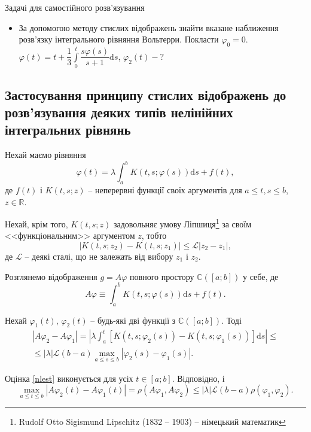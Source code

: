 \documentclass[14pt,twoside]{extreport}
\theoremstyle{mystyle}
\newcommand{\problems}{\bigskip\noindent\fbox{\HandPencilLeft}\hspace{6pt}\textsf{Задачі
		для самостійного розв'язування}}
\numberwithin{equation}{chapter}
\newcommand{\cab}{\mathbb{C}([a; b])}
\begin{document}
\begin{small}
\problems
\begin{itemize}
	\item За допомогою методу стислих відображень знайти вказане наближення розв'язку інтегрального рівняння Вольтерри. Покласти $\varphi_0=0$. $\varphi(t) = t + \dfrac{1}{3}\int\limits_{0}^{t} \dfrac{s\varphi(s)}{s+1} \mathrm{d}s$, $\varphi_2(t) - ?$
\end{itemize}
\end{small}

\subsection{Застосування принципу стислих відображень до розв'язування деяких типів нелінійних інтегральних рівнянь}

Нехай маємо рівняння
\begin{equation}\label{nlfred}
 \varphi(t) = \lambda \int_{a}^{b} K(t, s; \varphi(s)) \mathrm{d}s + f(t),
\end{equation}
де $f(t)$ і $K(t, s; z)$ -- неперервні функції своїх аргументів для $a \leqslant t, s \leqslant b$, $z\in \mathbb{R}$.

Нехай, крім того, $K(t, s; z)$ задовольняє умову Ліпшиця\footnote{Rudolf Otto Sigismund Lipschitz (1832 -- 1903) -- німецький математик} за своїм <<функціональним>> аргументом $z$, тобто
\[
 |K(t, s; z_2) - K(t, s; z_1)| \leqslant \mathscr{L} |z_2 -z_1|,
\]
де $\mathscr{L}$ -- деякі сталі, що не залежать від вибору $z_1$ і $z_2$.

Розглянемо відображення $g = A\varphi$ повного простору $\cab$ у себе, де
\begin{equation}
 A\varphi \equiv \int_{a}^{b} K(t, s; \varphi(s)) \mathrm{d}s + f(t).
\end{equation}

Нехай $\varphi_1(t)$, $\varphi_2(t)$ -- будь-які дві функції з $\cab$. Тоді
\begin{multline}\label{nlest}
 |A\varphi_2 - A\varphi_1| = \left|\lambda \int_{a}^{t} [K(t, s; \varphi_2(s)) - K(t, s; \varphi_1(s))]\mathrm{d}s\right|\leqslant\\
 \leqslant |\lambda| \mathscr{L} (b-a) \max\limits_{a \leqslant s \leqslant b} |\varphi_2(s) - \varphi_1(s)|.
\end{multline}

Оцінка \eqref{nlest} виконується для усіх $t \in [a; b]$. Відповідно, і
\[
 \max\limits_{a \leqslant t \leqslant b} |A\varphi_2(t) - A\varphi_1(t)| = \rho(A\varphi_1, A\varphi_2) \leqslant |\lambda| \mathscr{L}(b-a) \rho(\varphi_1, \varphi_2).
\]
\end{document}
